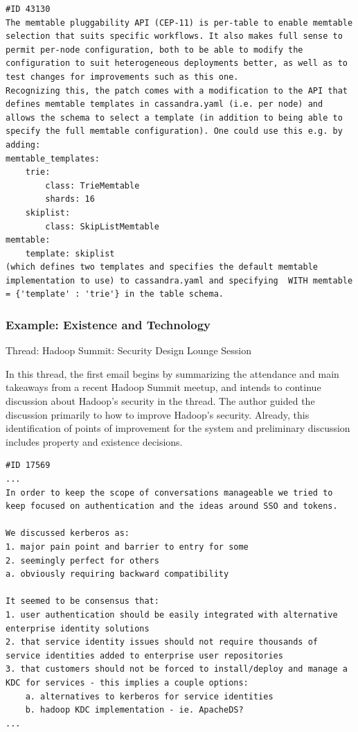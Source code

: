 \documentclass[a4paper, 12pt]{article}
\begin{document}
			\begin{verbatim}
#ID 43130
The memtable pluggability API (CEP-11) is per-table to enable memtable selection that suits specific workflows. It also makes full sense to permit per-node configuration, both to be able to modify the configuration to suit heterogeneous deployments better, as well as to test changes for improvements such as this one. 
Recognizing this, the patch comes with a modification to the API that defines memtable templates in cassandra.yaml (i.e. per node) and allows the schema to select a template (in addition to being able to specify the full memtable configuration). One could use this e.g. by adding:
memtable_templates:
	trie:
		class: TrieMemtable
		shards: 16
	skiplist:
		class: SkipListMemtable
memtable:
	template: skiplist 
(which defines two templates and specifies the default memtable implementation to use) to cassandra.yaml and specifying  WITH memtable = {'template' : 'trie'} in the table schema.
			\end{verbatim}
		
		\subsubsection{Example: Existence and Technology}
			\footnotesize
				Thread: Hadoop Summit: Security Design Lounge Session
			\normalsize
			
			In this thread, the first email begins by summarizing the attendance and main takeaways from a recent Hadoop Summit meetup, and intends to continue discussion about Hadoop's security in the thread. The author guided the discussion primarily to how to improve Hadoop's security. Already, this identification of points of improvement for the system and preliminary discussion includes property and existence decisions.
			
			\begin{verbatim}
#ID 17569
...
In order to keep the scope of conversations manageable we tried to keep focused on authentication and the ideas around SSO and tokens.

We discussed kerberos as:
1. major pain point and barrier to entry for some
2. seemingly perfect for others
a. obviously requiring backward compatibility

It seemed to be consensus that:
1. user authentication should be easily integrated with alternative enterprise identity solutions
2. that service identity issues should not require thousands of service identities added to enterprise user repositories
3. that customers should not be forced to install/deploy and manage a KDC for services - this implies a couple options:
	a. alternatives to kerberos for service identities
	b. hadoop KDC implementation - ie. ApacheDS?
...
			\end{verbatim}
			
\end{document}
